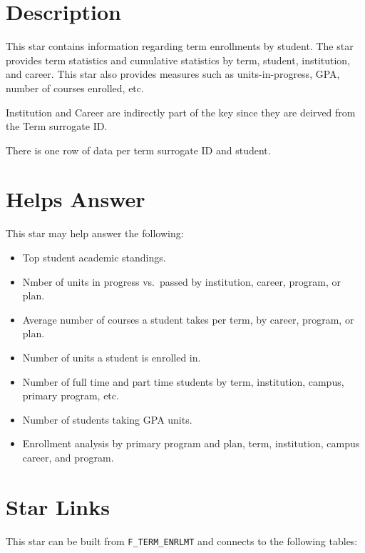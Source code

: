 \documentclass[
]{book}
\providecommand{\tightlist}{%
  \setlength{\itemsep}{0pt}\setlength{\parskip}{0pt}}
\begin{document}
\hypertarget{description-1}{%
\section{Description}\label{description-1}}

This star contains information regarding term enrollments by student. The star provides term statistics and cumulative statistics by term, student, institution, and career. This star also provides measures such as units-in-progress, GPA, number of courses enrolled, etc.

Institution and Career are indirectly part of the key since they are deirved from the Term surrogate ID.

There is one row of data per term surrogate ID and student.

\hypertarget{helps-answer-1}{%
\section{Helps Answer}\label{helps-answer-1}}

This star may help answer the following:

\begin{itemize}
\tightlist
\item
  Top student academic standings.
\item
  Nmber of units in progress vs.~passed by institution, career, program, or plan.
\item
  Average number of courses a student takes per term, by career, program, or plan.
\item
  Number of units a student is enrolled in.
\item
  Number of full time and part time students by term, institution, campus, primary program, etc.
\item
  Number of students taking GPA units.
\item
  Enrollment analysis by primary program and plan, term, institution, campus career, and program.
\end{itemize}

\hypertarget{star-links-1}{%
\section{Star Links}\label{star-links-1}}

This star can be built from \texttt{F\_TERM\_ENRLMT} and connects to the following tables:
\end{document}
